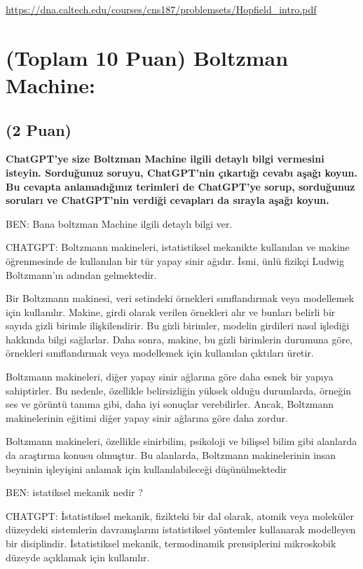 \documentclass[11pt]{article}
\begin{document}
\url{https://dna.caltech.edu/courses/cns187/problemsets/Hopfield_intro.pdf}


\section{(Toplam 10 Puan) Boltzman Machine:}

\subsection{(2 Puan)} \textbf{ChatGPT’ye size Boltzman Machine ilgili detaylı bilgi vermesini isteyin. Sorduğunuz soruyu, ChatGPT'nin çıkartığı cevabı aşağı koyun. Bu cevapta anlamadığınız terimleri de ChatGPT’ye sorup, sorduğunuz soruları ve ChatGPT’nin verdiği cevapları da sırayla aşağı koyun.}

BEN: Bana boltzman Machine ilgili detaylı bilgi ver.

CHATGPT: Boltzmann makineleri, istatistiksel mekanikte kullanılan ve makine öğrenmesinde de kullanılan bir tür yapay sinir ağıdır. İsmi, ünlü fizikçi Ludwig Boltzmann'ın adından gelmektedir.

Bir Boltzmann makinesi, veri setindeki örnekleri sınıflandırmak veya modellemek için kullanılır. Makine, girdi olarak verilen örnekleri alır ve bunları belirli bir sayıda gizli birimle ilişkilendirir. Bu gizli birimler, modelin girdileri nasıl işlediği hakkında bilgi sağlarlar. Daha sonra, makine, bu gizli birimlerin durumuna göre, örnekleri sınıflandırmak veya modellemek için kullanılan çıktıları üretir.

Boltzmann makineleri, diğer yapay sinir ağlarına göre daha esnek bir yapıya sahiptirler. Bu nedenle, özellikle belirsizliğin yüksek olduğu durumlarda, örneğin ses ve görüntü tanıma gibi, daha iyi sonuçlar verebilirler. Ancak, Boltzmann makinelerinin eğitimi diğer yapay sinir ağlarına göre daha zordur.

Boltzmann makineleri, özellikle sinirbilim, psikoloji ve bilişsel bilim gibi alanlarda da araştırma konusu olmuştur. Bu alanlarda, Boltzmann makinelerinin insan beyninin işleyişini anlamak için kullanılabileceği düşünülmektedir

BEN: istatiksel mekanik nedir ?

CHATGPT: İstatistiksel mekanik, fizikteki bir dal olarak, atomik veya moleküler düzeydeki sistemlerin davranışlarını istatistiksel yöntemler kullanarak modelleyen bir disiplindir. İstatistiksel mekanik, termodinamik prensiplerini mikroskobik düzeyde açıklamak için kullanılır.
\end{document}
